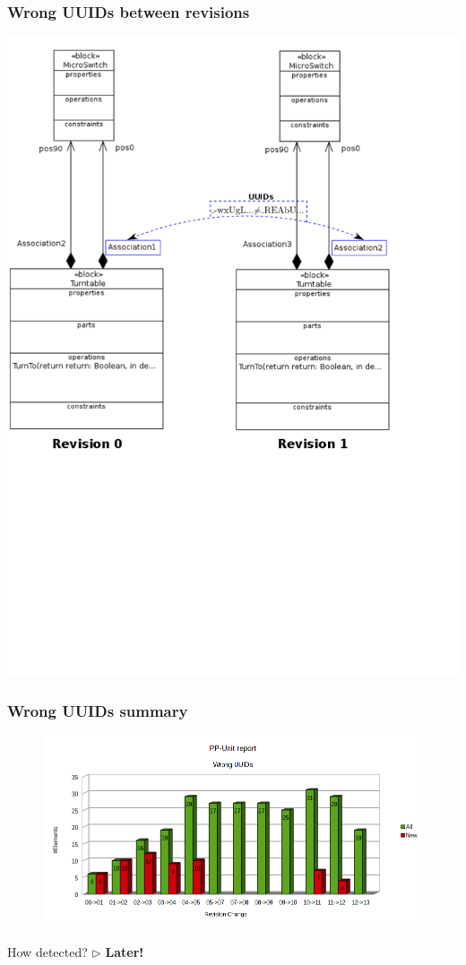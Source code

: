 \documentclass[10pt]{beamer}
\begin{document}
\begin{frame}
\frametitle{Wrong UUIDs between revisions}
\begin{center}
\includegraphics[scale=0.33]{wrongUUIDs_examples_p5}\\
\end{center}

\end{frame}
\begin{frame}
\frametitle{Wrong UUIDs summary}
\begin{center}
\begin{figure}%
\includegraphics[scale=0.45]{wrongUUIDs}\\
\end{figure}
How detected? $\bm\triangleright$ \textbf{Later!}
\end{center}
\end{frame}
\end{document}
